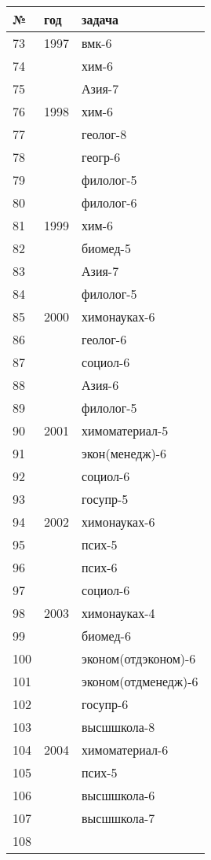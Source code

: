 \documentclass[12pt,a4paper]{report}
\begin{document}
\begin{center}
\begin{tabular}{|l|l|l|}
\hline
\end{tabular}
\begin{tabular}{|l|l|l|}
\hline
№&год&задача\\
\hline
73&1997&вмк-6\\
\hline
74&&хим-6\\
\hline
75&&Азия-7\\
\hline
76&1998&хим-6\\
\hline
77&&геолог-8\\
\hline
78&&геогр-6\\
\hline
79&&филолог-5\\
\hline
80&&филолог-6\\
\hline
81&1999&хим-6\\
\hline
82&&биомед-5\\
\hline
83&&Азия-7\\
\hline
84&&филолог-5\\
\hline
85&2000&химонауках-6\\
\hline
86&&геолог-6\\
\hline
87&&социол-6\\
\hline
88&&Азия-6\\
\hline
89&&филолог-5\\
\hline
90&2001&химоматериал-5\\
\hline
91&&экон(менедж)-6\\
\hline
92&&социол-6\\
\hline
93&&госупр-5\\
\hline
94&2002&химонауках-6\\
\hline
95&&псих-5\\
\hline
96&&псих-6\\
\hline
97&&социол-6\\
\hline
98&2003&химонауках-4\\
\hline
99&&биомед-6\\
\hline
100&&эконом(отдэконом)-6\\
\hline
101&&эконом(отдменедж)-6\\
\hline
102&&госупр-6\\
\hline
103&&высшшкола-8\\
\hline
104&2004&химоматериал-6\\
\hline
105&&псих-5\\
\hline
106&&высшшкола-6\\
\hline
107&&высшшкола-7\\
\hline
108&&\\
\hline
\end{tabular}
\end{center}
\end{document}

